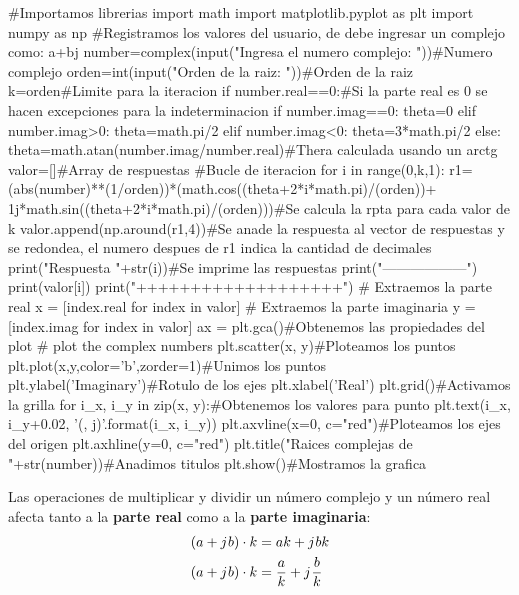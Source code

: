 \documentclass[
	12pt, %
	fleqn, %
	a4paper, %
	oneside, %
]{LegrandOrangeBook}
\begin{document}
\begin{python}
#Importamos librerias
import math
import matplotlib.pyplot as plt
import numpy as np
#Registramos los valores del usuario, de debe ingresar un complejo como: a+bj
number=complex(input("Ingresa el numero complejo: "))#Numero complejo
orden=int(input("Orden de la raiz: "))#Orden de la raiz
k=orden#Limite para la iteracion
if number.real==0:#Si la parte real es 0 se hacen excepciones para la indeterminacion
    if number.imag==0:
        theta=0
    elif number.imag>0:
        theta=math.pi/2
    elif number.imag<0:
        theta=3*math.pi/2
else:
    theta=math.atan(number.imag/number.real)#Thera calculada usando un arctg
valor=[]#Array de respuestas
#Bucle de iteracion
for i in range(0,k,1):
    r1=(abs(number)**(1/orden))*(math.cos((theta+2*i*math.pi)/(orden))+
        1j*math.sin((theta+2*i*math.pi)/(orden)))#Se calcula la rpta para cada valor de k
    valor.append(np.around(r1,4))#Se anade la respuesta al vector de respuestas y se redondea, el numero despues de r1 indica la cantidad de decimales
    print("Respuesta "+str(i))#Se imprime las respuestas
    print("------------------")
    print(valor[i])
    print("+++++++++++++++++++")
# Extraemos la parte real
x = [index.real for index in valor]
# Extraemos la parte imaginaria
y = [index.imag for index in valor]
ax = plt.gca()#Obtenemos las propiedades del plot
# plot the complex numbers
plt.scatter(x, y)#Ploteamos los puntos
plt.plot(x,y,color='b',zorder=1)#Unimos los puntos
plt.ylabel('Imaginary')#Rotulo de los ejes
plt.xlabel('Real')
plt.grid()#Activamos la grilla
for i_x, i_y in zip(x, y):#Obtenemos los valores para punto
    plt.text(i_x, i_y+0.02, '({}, j{})'.format(i_x, i_y))
plt.axvline(x=0, c="red")#Ploteamos los ejes del origen
plt.axhline(y=0, c="red")
plt.title("Raices complejas de "+str(number))#Anadimos titulos
plt.show()#Mostramos la grafica
\end{python}
\begin{remark}
Las operaciones de multiplicar y dividir un número complejo y un número real afecta tanto a la \textbf{parte real} como a la \textbf{parte imaginaria}:
\begin{align*}
(a+{j\mkern1mu} b)\cdot k&=ak+{j\mkern1mu} bk\\
(a+{j\mkern1mu} b)\cdot k&=\frac{a}{k}+{j\mkern1mu} \frac{b}{k}
\end{align*}
\end{remark}
\end{document}
